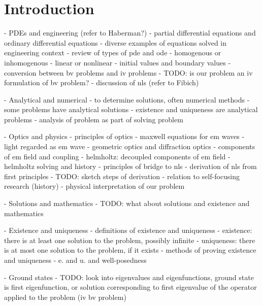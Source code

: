 \section{Introduction}
\begin{markdown}
- PDEs and engineering (refer to Haberman?)
    - partial differential equations and ordinary differential equations
    - diverse examples of equations solved in engineering context
    - review of types of pde and ode
        - homogenous or inhomogenous
        - linear or nonlinear
        - initial values and boundary values
        - conversion between bv problems and iv problems
        - TODO: is our problem an iv formulation of bv problem?
    - discussion of nls (refer to Fibich)

- Analytical and numerical
    - to determine solutions, often numerical methods
    - some problems have analytical solutions
    - existence and uniqueness are analytical problems
    - analysis of problem as part of solving problem

- Optics and physics
    - principles of optics
        - maxwell equations for em waves
        - light regarded as em wave
        - geometric optics and diffraction optics
        - components of em field and coupling
        - helmholtz: decoupled components of em field
        - helmholtz solving and history
        - principles of bridge to nls
    - derivation of nls from first principles
        - TODO: sketch steps of derivation
    - relation to self-focusing research (history)
    - physical interpretation of our problem

- Solutions and mathematics
    - TODO: what about solutions and existence and mathematics

- Existence and uniqueness
    - definitions of existence and uniqueness
        - existence: there is at least one solution to the problem, possibly infinite
        - uniqueness: there is at most one solution to the problem, if it exists
    - methods of proving existence and uniqueness
    - e. and u. and well-posedness

- Ground states
    - TODO: look into eigenvalues and eigenfunctions, ground state is first eigenfunction, or solution corresponding to first eigenvalue of the operator applied to the problem (iv bv problem)
\end{markdown}


